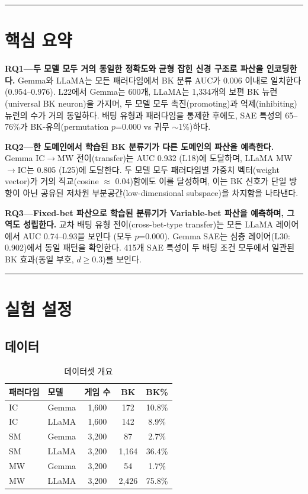 \documentclass[11pt,a4paper]{article}
\begin{document}
\bigskip\hrule\bigskip

\section*{핵심 요약}

\textbf{RQ1---두 모델 모두 거의 동일한 정확도와 균형 잡힌 신경 구조로 파산을 인코딩한다.} Gemma와 LLaMA는 모든 패러다임에서 BK 분류 AUC가 0.006 이내로 일치한다 (0.954--0.976). L22에서 Gemma는 600개, LLaMA는 1{,}334개의 보편 BK 뉴런(universal BK neuron)을 가지며, 두 모델 모두 촉진(promoting)과 억제(inhibiting) 뉴런의 수가 거의 동일하다. 배팅 유형과 패러다임을 통제한 후에도, SAE 특성의 65--76\%가 BK-유의(permutation $p$=0.000 vs 귀무 ${\sim}$1\%)하다.

\textbf{RQ2---한 도메인에서 학습된 BK 분류기가 다른 도메인의 파산을 예측한다.} Gemma IC$\rightarrow$MW 전이(transfer)는 AUC 0.932 (L18)에 도달하며, LLaMA MW$\rightarrow$IC는 0.805 (L25)에 도달한다. 두 모델 모두 패러다임별 가중치 벡터(weight vector)가 거의 직교(cosine $\approx$ 0.04)함에도 이를 달성하며, 이는 BK 신호가 단일 방향이 아닌 공유된 저차원 부분공간(low-dimensional subspace)을 차지함을 나타낸다.

\textbf{RQ3---Fixed-bet 파산으로 학습된 분류기가 Variable-bet 파산을 예측하며, 그 역도 성립한다.} 교차 배팅 유형 전이(cross-bet-type transfer)는 모든 LLaMA 레이어에서 AUC 0.74--0.93을 보인다 (모두 $p$=0.000). Gemma SAE는 심층 레이어(L30: 0.902)에서 동일 패턴을 확인한다. 415개 SAE 특성이 두 배팅 조건 모두에서 일관된 BK 효과(동일 부호, $d$$\geq$0.3)를 보인다.

\bigskip\hrule\bigskip

\section{실험 설정}

\subsection{데이터}

\begin{table}[H]
\centering
\caption{데이터셋 개요}
\begin{tabular}{llccc}
\toprule
\textbf{패러다임} & \textbf{모델} & \textbf{게임 수} & \textbf{BK} & \textbf{BK\%} \\
\midrule
IC & Gemma & 1{,}600 & 172 & 10.8\% \\
IC & LLaMA & 1{,}600 & 142 & 8.9\% \\
SM & Gemma & 3{,}200 & 87 & 2.7\% \\
SM & LLaMA & 3{,}200 & 1{,}164 & 36.4\% \\
MW & Gemma & 3{,}200 & 54 & 1.7\% \\
MW & LLaMA & 3{,}200 & 2{,}426 & 75.8\% \\
\bottomrule
\end{tabular}
\end{table}
\end{document}
